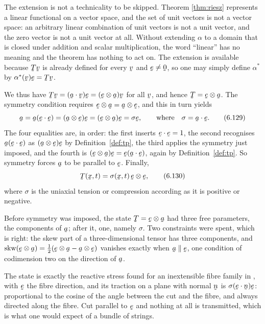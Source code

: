 The extension is not a technicality to be skipped. Theorem
\ref{thm:riesz} represents a linear functional on a vector space, and
the set of unit vectors is not a vector space: an arbitrary linear
combination of unit vectors is not a unit vector, and the zero vector
is not a unit vector at all. Without extending $\alpha$ to a domain
that is closed under addition and scalar multiplication, the word
``linear'' has no meaning and the theorem has nothing to act on. The
extension is available because $\bT\bv$ is already defined for every
$\bv$ and $\be\neq\bze$, so one may simply define $\alpha^{*}$ by
$\alpha^{*}(\bv)\be=\bT\bv$.

We thus have $\bT\bv=(\ip\ba\bv)\be=(\be\otimes\ba)\bv$ for all $\bv$,
and hence $\bT=\be\otimes\ba$. The symmetry condition 
requires $\be\otimes\ba=\ba\otimes\be$, and this in turn yields
\begin{equation}
   \ba=\ba(\ip\be\be)=(\ba\otimes\be)\be=(\be\otimes\ba)\be=\sigma\be ,
   \qquad\text{where}\quad \sigma=\ip\ba\be .
   \tag{6.129}\label{eq:6.129}
\end{equation}
The four equalities are, in order: the first inserts $\ip\be\be=1$, the
second recognises $\ba(\ip\be\be)$ as $(\ba\otimes\be)\be$ by
Definition~\ref{def:tp}, the third applies the symmetry just imposed,
and the fourth is $(\be\otimes\ba)\be=\be(\ip\ba\be)$, again by
Definition~\ref{def:tp}. So symmetry forces $\ba$ to be parallel to
$\be$. Finally,
\begin{equation}
   \bT(\bx,t)=\sigma(\bx,t)\,\be\otimes\be ,
   \tag{6.130}\label{eq:6.130}
\end{equation}
where $\sigma$ is the uniaxial tension or compression according as it
is positive or negative.

\begin{remark}\label{rem:ch6uniaxread}
Before symmetry was imposed, the state $\bT=\be\otimes\ba$ had three
free parameters, the components of $\ba$; after it, one, namely
$\sigma$. Two constraints were spent, which is right: the skew part of
a three-dimensional tensor has three components, and
$\Skw(\be\otimes\ba)=\tfrac12(\be\otimes\ba-\ba\otimes\be)$ vanishes
exactly when $\ba\parallel\be$, one condition of codimension two on the
direction of $\ba$.

The state  is exactly the reactive stress found for an
inextensible fibre family in , with $\be$ the fibre
direction, and its traction on a plane with normal $\bn$ is
$\sigma(\ip\be\bn)\be$: proportional to the cosine of the angle between
the cut and the fibre, and always directed along the fibre. Cut
parallel to $\be$ and nothing at all is transmitted, which is what one
would expect of a bundle of strings.
\end{remark}

